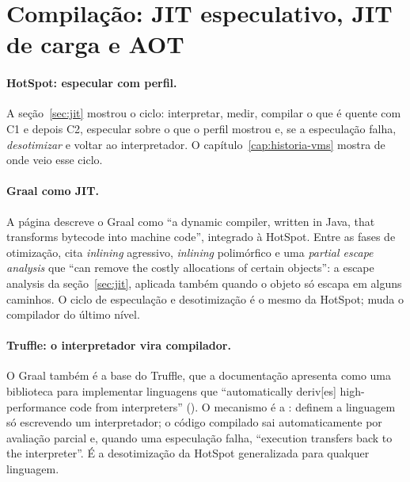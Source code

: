 \section{Compilação: JIT especulativo, JIT de carga e AOT}
\label{sec:vms-jit-aot}

\paragraph{HotSpot: especular com perfil.}
A seção~\ref{sec:jit} mostrou o ciclo: interpretar, medir, compilar o que
é quente com C1 e depois C2, especular sobre o que o perfil mostrou e,
se a especulação falha, \emph{desotimizar} e voltar ao interpretador.
O capítulo~\ref{cap:historia-vms} mostra de onde veio esse ciclo.

\paragraph{Graal como JIT.}
A página  descreve o Graal como
\enquote{a dynamic compiler, written in Java, that transforms bytecode
into machine code}, integrado à HotSpot. Entre as fases de otimização,
cita \emph{inlining} agressivo, \emph{inlining} polimórfico e uma
\emph{partial escape analysis} que \enquote{can remove the costly
allocations of certain objects}: a escape analysis da seção~\ref{sec:jit},
aplicada também quando o objeto só escapa em alguns caminhos. O
ciclo de especulação e desotimização é o mesmo da HotSpot; muda o
compilador do último nível.

\paragraph{Truffle: o interpretador vira compilador.}
O Graal também é a base do Truffle, que a documentação apresenta como
uma biblioteca para implementar linguagens que \enquote{automatically
deriv[es] high-performance code from interpreters}
(). O mecanismo é a
: \textcite{paper:truffle-partial-evaluation} definem a
linguagem só escrevendo um interpretador; o código compilado sai
automaticamente por avaliação parcial e, quando uma especulação falha,
\enquote{execution transfers back to the interpreter}. É a desotimização
da HotSpot generalizada para qualquer linguagem.

